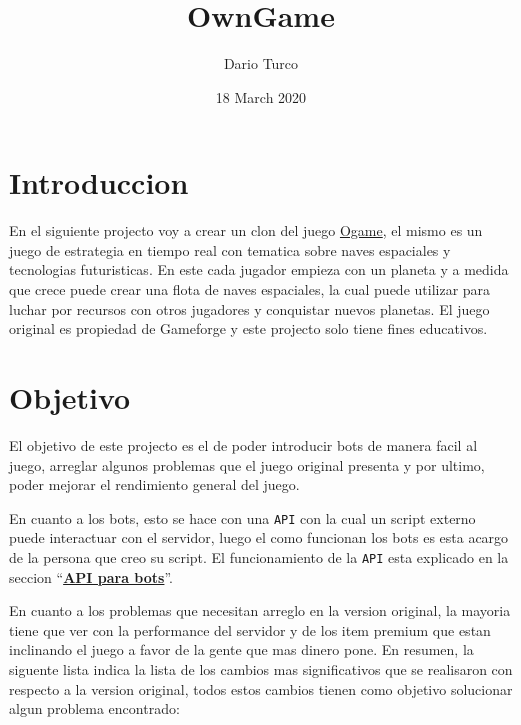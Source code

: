 \documentclass{article}
\title{OwnGame}
\author{Dario Turco}
\date{18 March 2020}
\begin{document}
\maketitle
\tableofcontents
\newpage
\section{Introduccion}

En el siguiente projecto voy a crear un clon del juego \href{https://en.ogame.gameforge.com}{Ogame}, el mismo es un juego de estrategia en tiempo real con tematica sobre naves espaciales y tecnologias futuristicas. En este cada jugador empieza con un planeta y a medida que crece puede crear una flota de naves espaciales, la cual puede utilizar para luchar por recursos con otros jugadores y conquistar nuevos planetas. El juego original es propiedad de Gameforge  y este projecto solo tiene fines educativos.

\section{Objetivo}

El objetivo de este projecto es el de poder introducir bots de manera facil al juego, arreglar algunos problemas que el juego original presenta y por ultimo, poder mejorar el rendimiento general del juego.

En cuanto a los bots, esto se hace con una \texttt{API} con la cual un script externo puede interactuar con el servidor, luego el como funcionan los bots es esta acargo de la persona que creo su script. El funcionamiento de la \texttt{API} esta explicado en la seccion ``\hyperlink{API-Section}{\textbf{API para bots}}''.

En cuanto a los problemas que necesitan arreglo en la version original, la mayoria tiene que ver con la performance del servidor y de los item premium que estan inclinando el juego a favor de la gente que mas dinero pone. En resumen, la siguente lista indica la lista de los cambios mas significativos que se realisaron con respecto a la version original, todos estos cambios tienen como objetivo solucionar algun problema encontrado: 
\end{document}
